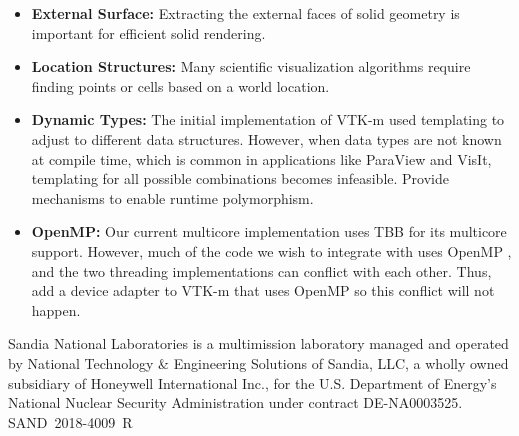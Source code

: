 \begin{itemize}
\item \textbf{External Surface:}
  Extracting the external faces of solid geometry is important for efficient solid rendering.
\item \textbf{Location Structures:}
  Many scientific visualization algorithms require finding points or cells based on a world location.
\item \textbf{Dynamic Types:}
  The initial implementation of VTK-m used templating to adjust to different data structures.
  However, when data types are not known at compile time, which is common in applications like ParaView and VisIt, templating for all possible combinations becomes infeasible.
  Provide mechanisms to enable runtime polymorphism.
\item \textbf{OpenMP:}
  Our current multicore implementation uses TBB \cite{TBB} for its multicore support.
  However, much of the code we wish to integrate with uses OpenMP \cite{OpenMP}, and the two threading implementations can conflict with each other.
  Thus, add a device adapter to VTK-m that uses OpenMP so this conflict will not happen.
\end{itemize}

\noindent
{\tiny Sandia National Laboratories is a multimission laboratory managed and operated by National Technology \& Engineering Solutions of Sandia, LLC, a wholly owned subsidiary of Honeywell International Inc., for the U.S. Department of Energy's National Nuclear Security Administration under contract DE-NA0003525. \hfill SAND~2018-4009~R
\par}
